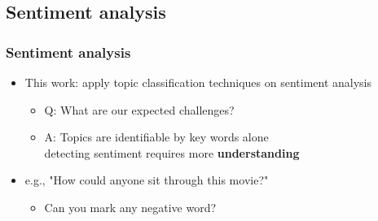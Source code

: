 \documentclass{beamer}
\begin{document}
\subsection{Sentiment analysis}

\begin{frame}
	\frametitle{Sentiment analysis}
	\begin{itemize}
	\item This work: apply topic classification techniques on sentiment analysis
	\begin{itemize}
		\item Q: What are our expected challenges?
		\pause %
		\item A: Topics are identifiable by key words alone \\ detecting sentiment requires more \textbf{understanding}
	\end{itemize}
	\end{itemize}
	
	\pause %
	\begin{itemize}
		\item e.g., "How could anyone sit through this movie?"
		\begin{itemize}
			\item Can you mark  any negative word?
		\end{itemize}
	
	\end{itemize}
	
	

\end{frame}
\fi
\end{document}
